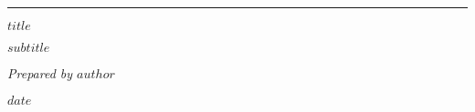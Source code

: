 
\hrule
{\Large\bfseries $title$ \par}
\vspace{1ex}
{\large\bfseries $subtitle$ \par}
\vspace{1ex}
{\large\it Prepared by $author$ \par}
{$date$ \par}
\vspace{2ex}

